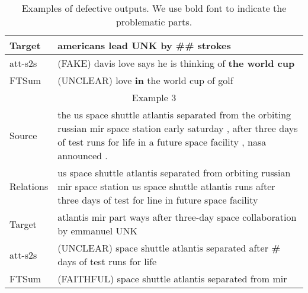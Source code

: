 \documentclass[letterpaper]{article} \usepackage{aaai18}  \usepackage{times}  \usepackage{helvet}  \usepackage{courier}  \usepackage{url}  \usepackage{graphicx}  \usepackage{amsfonts}
\begin{document}
\begin{table*}[ht]
\begin{tabularx}{\linewidth}{p{1.2cm}|X}
			\multicolumn{1}{l|}{Target}    & americans lead UNK by \#\# strokes                                                                                                                                                        \\ \hline
			\multicolumn{1}{l|}{att-s2s}   & (FAKE) davis love says he is thinking of \textbf{the world cup }                                                                                                            \\ \hline
			\multicolumn{1}{l|}{FTSum}     & (UNCLEAR) love \textbf{in} the world cup of golf                                                                                                                            \\ \hline
			\multicolumn{2}{c}{Example 3}                                                                                                                                                                                              \\ \hline
			\multicolumn{1}{l|}{Source}    & the us space shuttle atlantis separated from the orbiting russian mir space station early saturday , after three days of test runs for life in a future space facility , nasa announced . \\ \hline
			\multicolumn{1}{l|}{Relations} & us space shuttle atlantis separated from orbiting russian mir space station  us space shuttle atlantis runs after three days of test for line in future space facility               \\ \hline
			\multicolumn{1}{l|}{Target}    & atlantis mir part ways after three-day space collaboration by emmanuel UNK                                                                                                                \\ \hline
			\multicolumn{1}{l|}{att-s2s}   & (UNCLEAR) space shuttle atlantis separated after \textbf{\#} days of test runs for life                                                                                     \\ \hline
			\multicolumn{1}{l|}{FTSum}     & (FAITHFUL) space shuttle atlantis separated from mir                                                                                                                          \\ \hline
		\end{tabularx}
		\caption{Examples of defective outputs. We use bold font to indicate the problematic parts.}
		\label{tb:faithfulness_examples}
	\end{table*}
	
\end{document}
